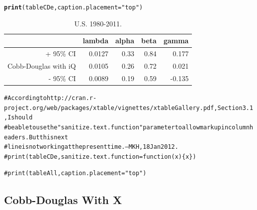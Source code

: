 \documentclass[preprint,authoryear,12pt]{elsarticle}\usepackage{graphicx, color}
\makeatletter
\newcommand{\hlfunctioncall}[1]{\textcolor[rgb]{0.501960784313725,0,0.329411764705882}{\textbf{#1}}}%
\newcommand{\hlstring}[1]{\textcolor[rgb]{0.6,0.6,1}{#1}}%
\newcommand{\hlcomment}[1]{\textcolor[rgb]{0.180392156862745,0.6,0.341176470588235}{#1}}%
\newenvironment{kframe}{%
 \def\at@end@of@kframe{}%
 \ifinner\ifhmode%
  \def\at@end@of@kframe{\end{minipage}}%
  \begin{minipage}{\columnwidth}%
 \fi\fi%
 \def\FrameCommand##1{\hskip\@totalleftmargin \hskip-\fboxsep
 \colorbox{shadecolor}{##1}\hskip-\fboxsep
     \hskip-\linewidth \hskip-\@totalleftmargin \hskip\columnwidth}%
 \MakeFramed {\advance\hsize-\width
   \@totalleftmargin\z@ \linewidth\hsize
   \@setminipage}}%
 {\par\unskip\endMakeFramed%
 \at@end@of@kframe}
\makeatother
\begin{document}
\begin{kframe}
\begin{alltt}

\hlfunctioncall{print}(tableCDe, caption.placement=\hlstring{"top"})
\end{alltt}
\end{kframe}%
\begin{table}[ht]
\begin{center}
\caption{U.S. 1980-2011.}
\begin{tabular}{rrrrr}
  \hline
 & lambda & alpha & beta & gamma \\ 
  \hline
+ 95\% CI & 0.0127 & 0.33 & 0.84 & 0.177 \\ 
  Cobb-Douglas with iQ & 0.0105 & 0.26 & 0.72 & 0.021 \\ 
  - 95\% CI & 0.0089 & 0.19 & 0.59 & -0.135 \\ 
   \hline
\end{tabular}
\end{center}
\end{table}
\begin{kframe}\begin{alltt}
\hlcomment{# According to http://cran.r-project.org/web/packages/xtable/vignettes/xtableGallery.pdf, Section 3.1, I should }
\hlcomment{# be able to use the "sanitize.text.function" parameter to allow markup in column headers. But this next}
\hlcomment{# line is not working at the present time. --MKH, 18 Jan 2012.}
\hlcomment{# print(tableCDe, sanitize.text.function = function(x)\{x\})}

\hlcomment{#print(tableAll, caption.placement="top")}
\end{alltt}
\end{kframe}


\subsection{Cobb-Douglas With X}
\end{document}
